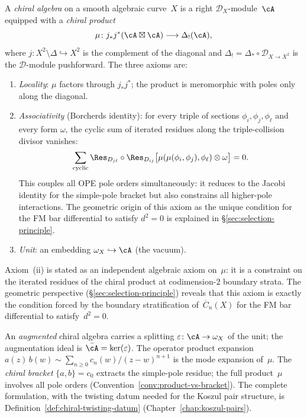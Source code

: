 \begin{definition}\label{def:chiral-algebra}
A \emph{chiral algebra} on a smooth algebraic curve~$X$ is a
right $\mathcal{D}_X$-module~$\cA$ equipped with a
\emph{chiral product}
\[
\mu \colon j_* j^*(\cA \boxtimes \cA) \longrightarrow
\Delta_!(\cA),
\]
where $j \colon X^2 \setminus \Delta \hookrightarrow X^2$ is the
complement of the diagonal and
$\Delta_! = \Delta_* \circ \mathcal{D}_{X \to X^2}$ is the
$\mathcal{D}$-module pushforward. The three axioms are:
\begin{enumerate}[label=\textup{(\roman*)}]
\item \emph{Locality}: $\mu$ factors through $j_* j^*$;
 the product is meromorphic with poles only along the
 diagonal.
\item \emph{Associativity} (Borcherds identity):
 for every triple of sections $\phi_i, \phi_j, \phi_\ell$
 and every form $\omega$, the cyclic sum of iterated
 residues along the triple-collision divisor vanishes:
 \begin{equation}\label{eq:borcherds-axiom}
 \sum_{\textup{cyclic}}
 \Res_{D_{j\ell}} \circ \Res_{D_{ij}}
 \bigl[\mu(\mu(\phi_i, \phi_j), \phi_\ell)
 \otimes \omega\bigr] = 0.
 \end{equation}
 This couples all OPE pole orders simultaneously:
 it reduces to the Jacobi identity for the simple-pole
 bracket but also constrains all higher-pole
 interactions. The geometric origin of this axiom as
 the unique condition for the FM bar differential to
 satisfy $d^2 = 0$ is explained in
 \S\ref{sec:selection-principle}.
\item \emph{Unit}: an embedding
 $\omega_X \hookrightarrow \cA$ (the vacuum).
\end{enumerate}
Axiom~(ii) is stated as an independent algebraic axiom
on~$\mu$: it is a constraint on the iterated residues of
the chiral product at codimension-$2$ boundary strata.
The geometric perspective
(\S\ref{sec:selection-principle}) reveals that this axiom
is exactly the condition forced by the boundary
stratification of~$\overline{C}_n(X)$ for the FM bar
differential to satisfy~$d^2 = 0$.

An \emph{augmented} chiral algebra carries a splitting
$\varepsilon \colon \cA \to \omega_X$ of the unit; the
augmentation ideal is
$\bar{\cA} = \ker(\varepsilon)$.
The operator product expansion
$a(z)\,b(w) \sim \sum_{n \geq 0} c_n(w)/(z-w)^{n+1}$
is the mode expansion of~$\mu$. The \emph{chiral bracket}
$\{a, b\} = c_0$ extracts the simple-pole residue; the full
product~$\mu$ involves all pole orders
(Convention~\ref{conv:product-vs-bracket}).
The complete formulation, with the twisting datum
needed for the Koszul pair structure, is
Definition~\ref{def:chiral-twisting-datum}
(Chapter~\ref{chap:koszul-pairs}).
\end{definition}

